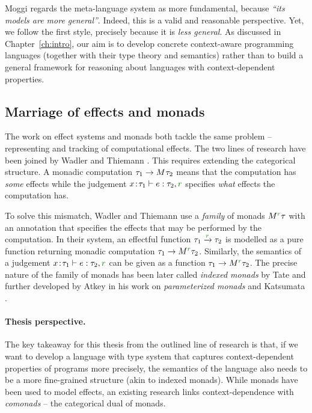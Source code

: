 Moggi regards the meta-language system as more fundamental, because \emph{``its models are more 
general''}. Indeed, this is a valid and reasonable perspective. Yet, we follow the first style,
precisely because it is \emph{less general}. As discussed in Chapter~\ref{ch:intro}, our aim is 
to develop concrete context-aware programming languages (together with their type theory and 
semantics) rather than to build a general framework for reasoning about languages with 
context-dependent properties.


\subsection{Marriage of effects and monads}
\label{sec:path-sem-effects}

The work on effect systems and monads both tackle the same problem -- representing and tracking of 
computational effects. The two lines of research have been joined by Wadler and Thiemann
\cite{monads-effects-marriage}. This requires extending the categorical structure. A monadic
computation $\tau_1 \rightarrow M^{}\tau_2$ means that the computation has \emph{some} 
effects while the judgement $x\!:\!\tau_1 \vdash e : \tau_2, \cclrd{r}$ specifies \emph{what} effects
the computation has.

To solve this mismatch, Wadler and Thiemann use a \emph{family} of monads $\mtyp{\cclrd{r}}{\tau}$
with an annotation that specifies the effects that may be performed by the computation. In their
system, an effectful function $\tau_1 \xrightarrow{\cclrd{r}} \tau_2$ is modelled as a pure 
function returning monadic computation $\tau_1 \rightarrow \mtyp{\cclrd{r}}{\tau_2}$. Similarly, the
semantics of a judgement $x\!:\!\tau_1 \vdash e : \tau_2, \cclrd{r}$ can be given as a function 
$\tau_1 \rightarrow \mtyp{\cclrd{r}}{\tau_2}$. 
The precise nature of the family of monads has been later called \emph{indexed monads} by Tate
\cite{effects-producer-semantics} and further developed by Atkey \cite{monads-parameterised-notions} 
in his work on \emph{parameterized monads} and Katsumata \cite{monads-parametric}.

\paragraph{Thesis perspective.}
The key takeaway for this thesis from the outlined line of research is that, if we want to develop a 
language with type system that captures context-dependent properties of programs more precisely,
the semantics of the language also needs to be a more fine-grained structure (akin to indexed 
monads). While monads have been used to model effects, an existing research links context-dependence
with \emph{comonads} -- the categorical dual of monads.


